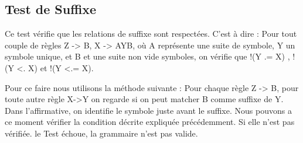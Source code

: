 	\subsection{Test de Suffixe}
		Ce test vérifie que les relations de suffixe sont respectées. C'est à dire :
		Pour tout couple de règles Z -> B, X -> AYB, où A représente une suite de symbole, Y un symbole unique,
		et B et une suite non vide symboles, on vérifie que !(Y .= X) , !(Y <. X) et !(Y <.= X).
		
		Pour ce faire nous utilisons la méthode suivante : 
		Pour chaque règle Z -> B, pour toute autre règle X->Y on regarde si on peut matcher B comme suffixe de Y.
		Dans l'affirmative, on identifie le symbole juste avant le suffixe. Nous pouvons a ce moment vérifier la
		condition décrite expliquée précédemment. Si elle n'est pas vérifiée. le Test échoue, la grammaire n'est pas valide.

